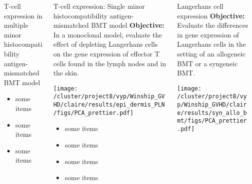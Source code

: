 \documentclass[final,hyperref={pdfpagelabels=false}]{beamer}
\begin{document}
\begin{frame}{}
\begin{columns}[t]
\begin{column}{.24\linewidth}
\begin{block}{T-cell expression in multiple minor histocompatibility antigen-mismatched BMT model}
          \begin{itemize}
          \item some items
          \item some items
          \item some items
          \end{itemize}
        \end{block}
      \end{column}



      \begin{column}{.25\linewidth}
        \begin{block}{T-cell expression: Single minor histocompatibility antigen-mismatched BMT model}
	  {\bf Objective:} In a monoclonal model, evaluate the effect of depleting Langerhans cells on the gene expression of effector T cells found in the lymph nodes and in the skin.
	  \begin{center}
	   \texttt{[image: /cluster/project8/vyp/Winship\_GVHD/claire/results/epi\_dermis\_PLN/figs/PCA\_prettier.pdf]}
            \end{center}
          \begin{itemize}
          \item some items
          \item some items
          \item some items
          \item some items
          \end{itemize}
        \end{block}
      \end{column}


      \begin{column}{.25\linewidth}
        \begin{block}{Langerhans cell expression}
	  {\bf Objective:} Evaluate the differences in gene expression of Langerhans cells in the setting of an allogeneic BMT or a syngeneic BMT.
           \begin{center}
           \texttt{[image: /cluster/project8/vyp/Winship\_GVHD/claire/results/syn\_allo\_bmt/figs/PCA\_prettier.pdf]}
          \end{center}


\end{block}
\end{column}
\end{columns}
\end{frame}
\end{document}
